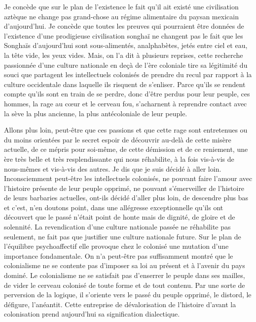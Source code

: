 \documentclass[french,twoside]{book} %
\begin{document}
Je concède que sur le plan de l’existence le fait qu’il ait existé une civilisation aztèque ne change pas grand-chose au régime alimentaire du paysan mexicain d’aujourd’hui. Je concède que toutes les preuves qui pourraient être données de l’existence d’une prodigieuse civilisation songhaï ne changent pas le fait que les Songhaïs d’aujourd’hui sont sous-alimentés, analphabètes, jetés entre ciel et eau, la tête vide, les yeux vides. Mais, on l’a dit à plusieurs reprises, cette recherche passionnée d’une culture nationale en deçà de l’ère coloniale tire sa légitimité du souci que partagent les intellectuels colonisés de prendre du recul par rapport à la culture occidentale dans laquelle ils risquent de s’enliser. Parce qu’ils se rendent compte qu’ils sont en train de se perdre, donc d’être perdus pour leur peuple, ces hommes, la rage au cœur et le cerveau fou, s’acharnent à reprendre contact avec la sève la plus ancienne, la plus antécoloniale de leur peuple.\par
\bigbreak
\noindent Allons plus loin, peut-être que ces passions et que cette rage sont entretenues ou du moins orientées par le secret espoir de découvrir au-delà de cette misère actuelle, de ce mépris pour soi-même, de cette démission et de ce reniement, une ère très belle et très resplendissante qui nous réhabilite, à la fois vis-à-vis de nous-mêmes et vis-à-vis des autres. Je dis que je suis décidé à aller loin. Inconsciemment peut-être les intellectuels colonisés, ne pouvant faire l’amour avec l’histoire présente de leur peuple opprimé, ne pouvant s’émerveiller de l’histoire de leurs barbaries actuelles, ont-ils décidé d’aller plus loin, de descendre plus bas et c’est, n’en doutons point, dans une allégresse   exceptionnelle qu’ils ont découvert que le passé n’était point de honte mais de dignité, de gloire et de solennité. La revendication d’une culture nationale passée ne réhabilite pas seulement, ne fait pas que justifier une culture nationale future. Sur le plan de l’équilibre psychoaffectif elle provoque chez le colonisé une mutation d’une importance fondamentale. On n’a peut-être pas suffisamment montré que le colonialisme ne se contente pas d’imposer sa loi au présent et à l’avenir du pays dominé. Le colonialisme ne se satisfait pas d’enserrer le peuple dans ses mailles, de vider le cerveau colonisé de toute forme et de tout contenu. Par une sorte de perversion de la logique, il s’oriente vers le passé du peuple opprimé, le distord, le défigure, l’anéantit. Cette entreprise de dévalorisation de l’histoire d’avant la colonisation prend aujourd’hui sa signification dialectique.\par
\end{document}
